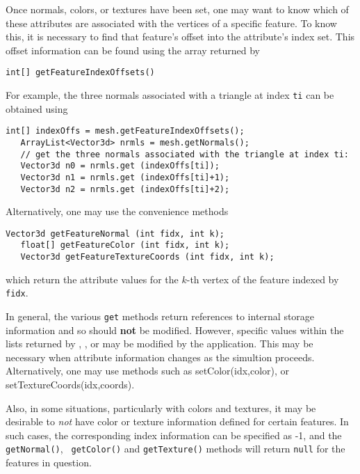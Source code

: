 Once normals, colors, or textures have been set, 
one may want to know which of these attributes are
associated with the vertices of a specific feature. To know this,
it is necessary to find that feature's offset into the 
attribute's index set. This offset information can
be found using the array returned by
%
\begin{lstlisting}[]
  int[] getFeatureIndexOffsets()
\end{lstlisting}
%
For example, the three normals associated with a triangle at index
{\tt ti} can be obtained using
%
\begin{lstlisting}[]
   int[] indexOffs = mesh.getFeatureIndexOffsets();
   ArrayList<Vector3d> nrmls = mesh.getNormals();
   // get the three normals associated with the triangle at index ti:
   Vector3d n0 = nrmls.get (indexOffs[ti]);
   Vector3d n1 = nrmls.get (indexOffs[ti]+1);
   Vector3d n2 = nrmls.get (indexOffs[ti]+2);
\end{lstlisting}
%
Alternatively, one may use the convenience methods
%
\begin{lstlisting}[]
   Vector3d getFeatureNormal (int fidx, int k);
   float[] getFeatureColor (int fidx, int k);
   Vector3d getFeatureTextureCoords (int fidx, int k);
\end{lstlisting}
%
which return the attribute values for the $k$-th vertex of
the feature indexed by {\tt fidx}.

In general, the various {\tt get} methods return references to
internal storage information and so should
{\bf not} be modified. However, specific values within the lists
returned by 
, 
, or
may be modified by the application.  This may be
necessary when attribute information changes as the simultion
proceeds. Alternatively, one may use methods such
as 
%
{setColor(idx,color)}, or
%
{setTextureCoords(idx,coords)}.

Also, in some situations, particularly with colors and textures, it
may be desirable to {\it not} have color or texture information
defined for certain features. In such cases, the corresponding index
information can be specified as -1, and the {\tt getNormal()}, {\tt
getColor()} and {\tt getTexture()} methods will return {\tt null} for
the features in question.

